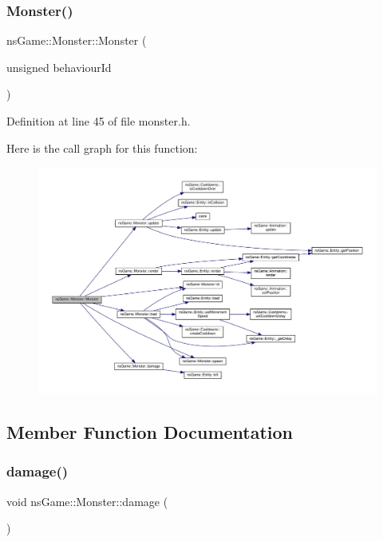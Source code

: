 \subsubsection{\texorpdfstring{Monster()}{Monster()}}
{\footnotesize\ttfamily ns\+Game\+::\+Monster\+::\+Monster (\begin{DoxyParamCaption}\item[{unsigned}]{behaviour\+Id }\end{DoxyParamCaption})\hspace{0.3cm}{\ttfamily [inline]}}



Definition at line 45 of file monster.\+h.

Here is the call graph for this function\+:\nopagebreak
\begin{figure}[H]
\begin{center}
\leavevmode
\includegraphics[width=350pt]{classns_game_1_1_monster_a93d359ec069d9667352b54e3b531b4e3_cgraph}
\end{center}
\end{figure}


\subsection{Member Function Documentation}
\mbox{\label{classns_game_1_1_monster_a48644849ca73888a148d6afb7eb0fa17}} 
\subsubsection{\texorpdfstring{damage()}{damage()}}
{\footnotesize\ttfamily void ns\+Game\+::\+Monster\+::damage (\begin{DoxyParamCaption}{ }\end{DoxyParamCaption})}



